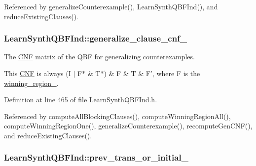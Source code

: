 Referenced by generalize\-Counterexample(), Learn\-Synth\-Q\-B\-F\-Ind(), and reduce\-Existing\-Clauses().

\hypertarget{classLearnSynthQBFInd_ad61b112cfcc60506f7b21c9ea9267b37}{
\subsubsection[{generalize\-\_\-clause\-\_\-cnf\-\_\-}]{ Learn\-Synth\-Q\-B\-F\-Ind\-::generalize\-\_\-clause\-\_\-cnf\-\_\-\hspace{0.3cm}{\ttfamily [protected]}}}\label{classLearnSynthQBFInd_ad61b112cfcc60506f7b21c9ea9267b37}


The \hyperlink{classCNF}{C\-N\-F} matrix of the Q\-B\-F for generalizing counterexamples. 

This \hyperlink{classCNF}{C\-N\-F} is always (I $|$ F$\ast$ \& T$\ast$) \& F \& T \& F', where F is the \hyperlink{classLearnSynthQBFInd_ab8ce6031137413e90e0626bbdc734be0}{winning\-\_\-region\-\_\-}. 

Definition at line 465 of file Learn\-Synth\-Q\-B\-F\-Ind.\-h.



Referenced by compute\-All\-Blocking\-Clauses(), compute\-Winning\-Region\-All(), compute\-Winning\-Region\-One(), generalize\-Counterexample(), recompute\-Gen\-C\-N\-F(), and reduce\-Existing\-Clauses().

\hypertarget{classLearnSynthQBFInd_ad99eafb7ee9134115f9fbe986e5eb0c5}{
\subsubsection[{prev\-\_\-trans\-\_\-or\-\_\-initial\-\_\-}]{ Learn\-Synth\-Q\-B\-F\-Ind\-::prev\-\_\-trans\-\_\-or\-\_\-initial\-\_\-\hspace{0.3cm}{\ttfamily [protected]}}}\label{classLearnSynthQBFInd_ad99eafb7ee9134115f9fbe986e5eb0c5}


